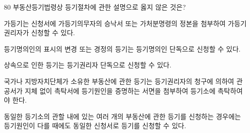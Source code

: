 \begin{question}{80}
부동산등기법령상 등기절차에 관한 설명으로 옳지 않은 것은?
\begin{choices}
  \item 가등기는 신청서에 가등기의무자의 승낙서 또는 가처분명령의 정본을 첨부하여 가등기권리자가 신청할 수 있다.
  \item 등기명의인의 표시의 변경 또는 경정의 등기는 등기명의인 단독으로 신청할 수 있다.
  \item 상속으로 인한 등기는 등기권리자 단독으로 신청할 수 있다.
  \item 국가나 지방자치단체가 소유한 부동산에 관한 등기는 등기권리자의 청구에 의하여 관공서가 지체 없이 촉탁서에 등기원인을 증명하는 서면을 첨부하여 등기소에 촉탁하여야 한다.
  \item 동일한 등기소의 관할 내에 있는 여러 개의 부동산에 관한 등기를 신청하는 경우에는 등기원인이 다를 때에도 동일한 신청서로 등기를 신청할 수 있다.
\end{choices}
\end{question}

